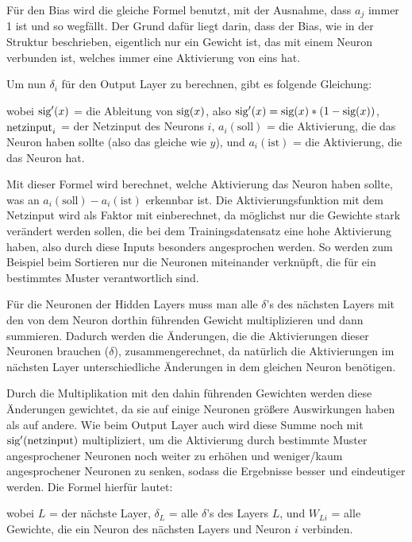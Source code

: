 \documentclass[11pt]{scrartcl}
\begin{document}
	Für den Bias wird die gleiche Formel benutzt, mit der Ausnahme, dass $a_j$ immer 1 ist und so wegfällt. Der Grund dafür liegt darin, dass der Bias, wie in der Struktur beschrieben, eigentlich nur ein Gewicht ist, das mit einem Neuron verbunden ist, welches immer eine Aktivierung von eins hat.

	Um nun $\delta_i$ für den Output Layer zu berechnen, gibt es folgende Gleichung: 

	\form{\[
		\delta_i = \sig '\left({\netin}_i\right) * (a_i (\textrm{soll}) - a_i (\textrm{ist})) 
	\]}

	wobei $\textrm{sig} '(x)$ = die Ableitung von $\textrm{sig}(x)$, also $\textrm{sig}'(x) = \textrm{sig}(x) * (1 - \textrm{sig}(x))$, $\textrm{netzinput}_i$ = der Netzinput des Neurons $i$, $a_i(\textrm{soll})$ = die Aktivierung, die das Neuron haben sollte (also das gleiche wie $y$), und $a_i(\textrm{ist})$ = die Aktivierung, die das Neuron hat.

	Mit dieser Formel wird berechnet, welche Aktivierung das Neuron haben sollte, was an $a_i(\textrm{soll}) - a_i(\textrm{ist})$ erkennbar ist. Die Aktivierungsfunktion mit dem Netzinput wird als Faktor mit einberechnet, da möglichst nur die Gewichte stark verändert werden sollen, die bei dem Trainingsdatensatz eine hohe Aktivierung haben, also durch diese Inputs besonders angesprochen werden. So werden zum Beispiel beim Sortieren nur die Neuronen miteinander verknüpft, die für ein bestimmtes Muster verantwortlich sind.
	
	Für die Neuronen der Hidden Layers muss man alle $\delta$'s des nächsten Layers mit den von dem Neuron dorthin führenden Gewicht multiplizieren und dann summieren. Dadurch werden die Änderungen, die die Aktivierungen dieser Neuronen brauchen ($\delta$), zusammengerechnet, da natürlich die Aktivierungen im nächsten Layer unterschiedliche Änderungen in dem gleichen Neuron benötigen.
	
	Durch die Multiplikation mit den dahin führenden Gewichten werden diese Änderungen gewichtet, da sie auf einige Neuronen größere Auswirkungen haben als auf andere. Wie beim Output Layer auch wird diese Summe noch mit $\textrm{sig}'(\textrm{netzinput})$ multipliziert, um die Aktivierung durch bestimmte Muster angesprochener Neuronen noch weiter zu erhöhen und weniger/kaum angesprochener Neuronen zu senken, sodass die Ergebnisse besser und eindeutiger werden. Die Formel hierfür lautet:


	\noindent wobei $L$ = der nächste Layer, $\delta_L$ = alle $\delta$'s des Layers $L$, und $W_{Li}$ = alle Gewichte, die ein Neuron des nächsten Layers und Neuron $i$ verbinden.
\end{document}
